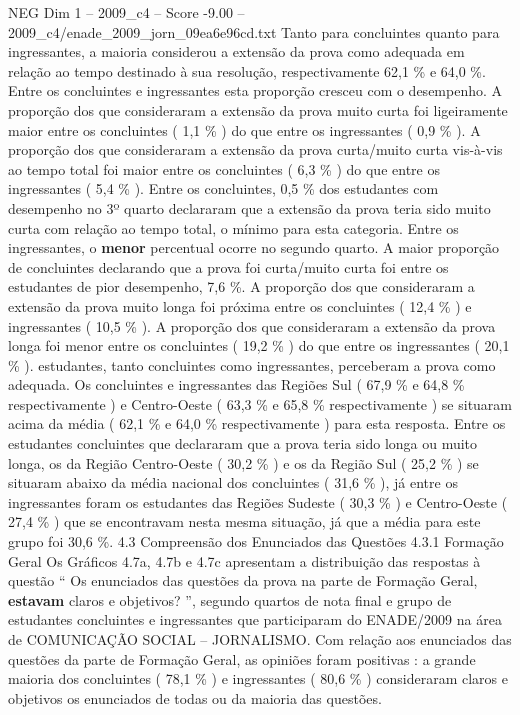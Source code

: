 \begin{textsample}{NEG Dim 1 – 2009\_c4 – Score -9.00 – 2009\_c4/enade\_2009\_jorn\_09ea6e96cd.txt}
Tanto para concluintes quanto para ingressantes, a maioria considerou a extensão da prova como adequada em relação ao tempo destinado à sua resolução, respectivamente 62,1 \% e 64,0 \%.
Entre os concluintes e ingressantes esta proporção cresceu com o desempenho.
A proporção dos que consideraram a extensão da prova muito curta foi ligeiramente maior entre os concluintes ( 1,1 \% ) do que entre os ingressantes ( 0,9 \% ).
A proporção dos que consideraram a extensão da prova curta/muito curta vis-à-vis ao tempo total foi maior entre os concluintes ( 6,3 \% ) do que entre os ingressantes ( 5,4 \% ).
Entre os concluintes, 0,5 \% dos estudantes com desempenho no 3º quarto declararam que a extensão da prova teria sido muito curta com relação ao tempo total, o mínimo para esta categoria.
Entre os ingressantes, o \textbf{menor} percentual ocorre no segundo quarto.
A maior proporção de concluintes declarando que a prova foi curta/muito curta foi entre os estudantes de pior desempenho, 7,6 \%.
A proporção dos que consideraram a extensão da prova muito longa foi próxima entre os concluintes ( 12,4 \% ) e ingressantes ( 10,5 \% ).
A proporção dos que consideraram a extensão da prova longa foi menor entre os concluintes ( 19,2 \% ) do que entre os ingressantes ( 20,1 \% ). estudantes, tanto concluintes como ingressantes, perceberam a prova como adequada.
Os concluintes e ingressantes das Regiões Sul ( 67,9 \% e 64,8 \% respectivamente ) e Centro-Oeste ( 63,3 \% e 65,8 \% respectivamente ) se situaram acima da média ( 62,1 \% e 64,0 \% respectivamente ) para esta resposta.
Entre os estudantes concluintes que declararam que a prova teria sido longa ou muito longa, os da Região Centro-Oeste ( 30,2 \% ) e os da Região Sul ( 25,2 \% ) se situaram abaixo da média nacional dos concluintes ( 31,6 \% ), já entre os ingressantes foram os estudantes das Regiões Sudeste ( 30,3 \% ) e Centro-Oeste ( 27,4 \% ) que se encontravam nesta mesma situação, já que a média para este grupo foi 30,6 \%. 4.3 Compreensão dos Enunciados das Questões 4.3.1 Formação Geral Os Gráficos 4.7a, 4.7b e 4.7c apresentam a distribuição das respostas à questão “ Os enunciados das questões da prova na parte de Formação Geral, \textbf{estavam} claros e objetivos? ”, segundo quartos de nota final e grupo de estudantes concluintes e ingressantes que participaram do ENADE/2009 na área de COMUNICAÇÃO SOCIAL – JORNALISMO.
Com relação aos enunciados das questões da parte de Formação Geral, as opiniões foram positivas : a grande maioria dos concluintes ( 78,1 \% ) e ingressantes ( 80,6 \% ) consideraram claros e objetivos os enunciados de todas ou da maioria das questões.

\end{textsample}
